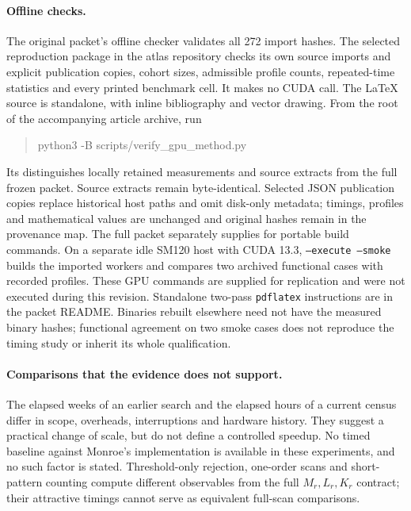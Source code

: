 \documentclass[11pt]{article}
\theoremstyle{definition}\newtheorem{remark}[theorem]{Remark}
\begin{document}
\paragraph{Offline checks.}
The original packet's offline checker validates all 272 import hashes.
The selected reproduction package in the atlas repository checks its own
source imports and explicit publication copies, cohort sizes, admissible profile counts, repeated-time
statistics and every printed benchmark cell. It makes
no CUDA call. The LaTeX source is standalone, with inline bibliography and
vector drawing. From the root of the accompanying article archive, run
\begin{quote}\small\ttfamily
python3 -B scripts/verify\_gpu\_method.py
\end{quote}
Its  distinguishes locally
retained measurements and source extracts from the full frozen packet.
Source extracts remain byte-identical. Selected JSON publication copies
replace historical host paths and omit disk-only metadata; timings,
profiles and mathematical values are unchanged and original hashes remain
in the provenance map.
The full packet separately supplies
 for portable build commands. On a separate idle
SM120 host with CUDA 13.3, \texttt{--execute --smoke} builds the imported
workers and compares two archived functional cases with recorded profiles.
These GPU commands are supplied for replication and were not executed
during this revision. Standalone two-pass \texttt{pdflatex} instructions
are in the packet README. Binaries rebuilt elsewhere need not have the
measured binary hashes; functional agreement on two smoke cases does not
reproduce the timing study or inherit its whole qualification.

\paragraph{Comparisons that the evidence does not support.}
The elapsed weeks of an earlier search and the elapsed hours of a current
census differ in scope, overheads, interruptions and hardware history.
They suggest a practical change of scale, but do not define a controlled
speedup. No timed baseline against Monroe's implementation is available in
these experiments, and no such factor is stated. Threshold-only rejection,
one-order scans and short-pattern counting compute different observables
from the full $M_r,L_r,K_r$ contract; their attractive timings cannot serve
as equivalent full-scan comparisons.
\end{document}
